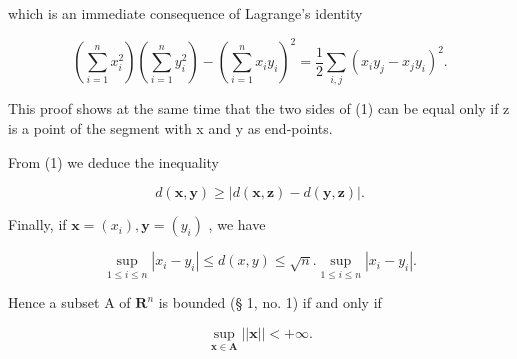 which is an immediate consequence of Lagrange's identity

\[
\left(\sum_ {i = 1} ^ {n} x _ {i} ^ {2}\right) \left(\sum_ {i = 1} ^ {n} y _ {i} ^ {2}\right) - \left(\sum_ {i = 1} ^ {n} x _ {i} y _ {i}\right) ^ {2} = \frac {1}{2} \sum_ {i, j} (x _ {i} y _ {j} - x _ {j} y _ {i}) ^ {2}.
\]

This proof shows at the same time that the two sides of (1) can be equal only if z is a point of the segment with x and y as end-points.

From (1) we deduce the inequality

\[
d (\boldsymbol {x}, \boldsymbol {y}) \geqslant | d (\boldsymbol {x}, \boldsymbol {z}) - d (\boldsymbol {y}, \boldsymbol {z}) |.\tag{2}
\]

Finally, if \(\pmb{x} = (x_{i}),\pmb{y} = (y_{i})\) , we have

\[
\sup _ {1 \leqslant i \leqslant n} | x _ {i} - y _ {i} | \leqslant d (x, y) \leqslant \sqrt {n}. \sup _ {1 \leqslant i \leqslant n} | x _ {i} - y _ {i} |.\tag{3}
\]

Hence a subset A of \(\mathbf{R}^n\) is bounded (§ 1, no. 1) if and only if

\[
\sup _ {\boldsymbol {x} \in \mathbf {A}} | | \boldsymbol {x} | | <   + \infty .
\]

